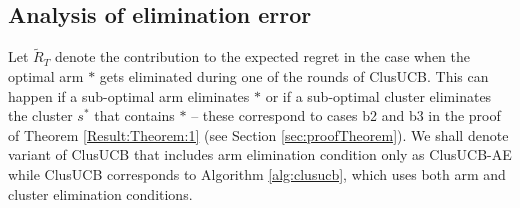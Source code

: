 % 
%
%
%
%
%

\subsection*{Analysis of elimination error}
Let $\widetilde R_T$ denote the contribution  to the expected regret in the case when the optimal arm $*$ gets eliminated during one of the rounds of ClusUCB. This can happen if a sub-optimal arm eliminates $*$ or if a sub-optimal cluster eliminates the cluster $s^*$ that contains $*$ -- these correspond to cases b2 and b3 in the proof of Theorem \ref{Result:Theorem:1} (see Section \ref{sec:proofTheorem}). 
We shall denote variant of ClusUCB that includes arm elimination condition only as ClusUCB-AE while ClusUCB corresponds to Algorithm \ref{alg:clusucb}, which uses both arm and cluster elimination conditions.

